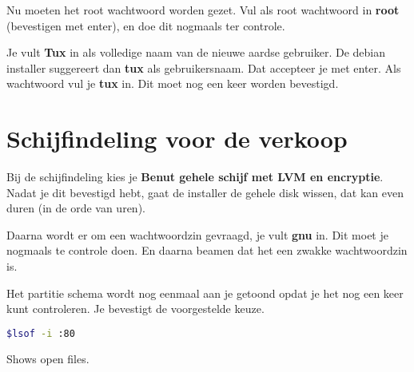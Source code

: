 \documentclass[12pt,a4paper]{article}
\begin{document}
Nu moeten het root wachtwoord worden gezet.
Vul als root wachtwoord in \textbf{root} (bevestigen met enter), en doe dit nogmaals ter controle.

Je vult \textbf{Tux} in als volledige naam van de nieuwe aardse gebruiker.
De debian installer suggereert dan \textbf{tux} als gebruikersnaam.
Dat accepteer je met enter.
Als wachtwoord vul je \textbf{tux} in. Dit moet nog een keer worden bevestigd.
\section{Schijfindeling voor de verkoop}
Bij de schijfindeling kies je \textbf{Benut gehele schijf met LVM en encryptie}. Nadat je dit bevestigd hebt, gaat de installer de gehele disk wissen, dat kan even duren (in de orde van uren).

Daarna wordt er om een wachtwoordzin gevraagd, je vult \textbf{gnu} in. Dit moet je nogmaals te controle doen. En daarna beamen dat het een zwakke wachtwoordzin is. 

Het partitie schema wordt nog eenmaal aan je getoond opdat je het nog een keer kunt controleren. Je bevestigt de voorgestelde keuze.

\begin{lstlisting}[language=bash]
$lsof -i :80
\end{lstlisting}
Shows open files.
\end{document}
